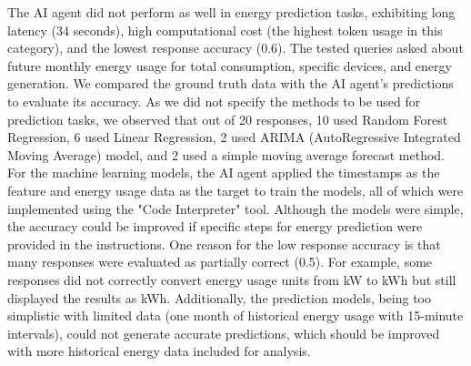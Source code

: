 \documentclass[final,3p,times]{elsarticle}
\begin{document}
The AI agent did not perform as well in energy prediction tasks, exhibiting long latency (34 seconds), high computational cost (the highest token usage in this category), and the lowest response accuracy (0.6). The tested queries asked about future monthly energy usage for total consumption, specific devices, and energy generation. We compared the ground truth data with the AI agent's predictions to evaluate its accuracy. As we did not specify the methods to be used for prediction tasks, we observed that out of 20 responses, 10 used Random Forest Regression, 6 used Linear Regression, 2 used ARIMA (AutoRegressive Integrated Moving Average) model, and 2 used a simple moving average forecast method. For the machine learning models, the AI agent applied the timestamps as the feature and energy usage data as the target to train the models, all of which were implemented using the "Code Interpreter" tool. Although the models were simple, the accuracy could be improved if specific steps for energy prediction were provided in the instructions. One reason for the low response accuracy is that many responses were evaluated as partially correct (0.5). For example, some responses did not correctly convert energy usage units from kW to kWh but still displayed the results as kWh. Additionally, the prediction models, being too simplistic with limited data (one month of historical energy usage with 15-minute intervals), could not generate accurate predictions, which should be improved with more historical energy data included for analysis.
\end{document}
